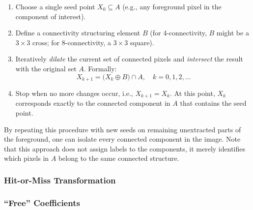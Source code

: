 \documentclass[a4paper,12pt]{article}
\begin{document}
\begin{enumerate}
    \item Choose a single seed point \( X_0 \subseteq A \) (e.g., any foreground pixel in the component of interest).
    \item Define a connectivity structuring element \(B\) (for 4-connectivity, \(B\) might be a \(3\times 3\) cross; for 8-connectivity, a \(3\times 3\) square).
    \item Iteratively \emph{dilate} the current set of connected pixels and \emph{intersect} the result with the original set \(A\). Formally:
    \[
      X_{k+1} = \bigl( X_k \oplus B \bigr) \cap A, \quad k = 0, 1, 2, \ldots
    \]
    \item Stop when no more changes occur, i.e., \( X_{k+1} = X_k \). At this point, \(X_k\) corresponds exactly to the connected component in \(A\) that contains the seed point.
\end{enumerate}

By repeating this procedure with new seeds on remaining unextracted parts of the foreground, one can isolate every connected component in the image. Note that this approach does not assign labels to the components, it merely identifies which pixels in \(A\) belong to the same connected structure.

\subsubsection{Hit-or-Miss Transformation}


\subsubsection{``Free'' Coefficients}

\end{document}
